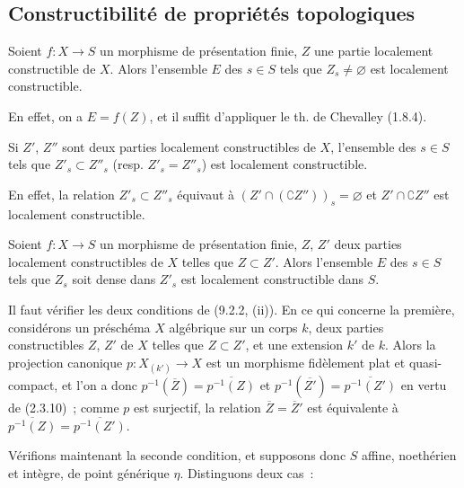 \subsection{Constructibilité de propriétés topologiques}
\label{subsection:IV.9.5-fr}

\begin{proposition}[9.5.1]
\label{IV.9.5.1-fr}
Soient $f:X\to S$ un morphisme de présentation finie, $Z$ une partie
localement constructible de $X$. Alors l'ensemble $E$ des $s\in S$ tels que
$Z_s\neq\varnothing$ est localement constructible.
\end{proposition}

En effet, on a $E=f(Z)$, et il suffit d'appliquer le th. de Chevalley (1.8.4).

\begin{corollary}[9.5.2]
\label{IV.9.5.2-fr}
Si $Z'$, $Z''$ sont deux parties localement constructibles de $X$, l'ensemble
des $s\in S$ tels que $Z'_s\subset Z''_s$ \textnormal{(resp.}
$Z'_s=Z''_s$\textnormal{)} est localement constructible.
\end{corollary}

En effet, la relation $Z'_s\subset Z''_s$ équivaut à
$(Z'\cap(\complement Z''))_s=\varnothing$ et
$Z'\cap\complement Z''$ est localement constructible.

\begin{proposition}[9.5.3]
\label{IV.9.5.3-fr}
Soient $f:X\to S$ un morphisme de présentation finie, $Z$, $Z'$ deux parties
localement constructibles de $X$ telles que $Z\subset Z'$. Alors l'ensemble
$E$ des $s\in S$ tels que $Z_s$ soit dense dans $Z'_s$ est localement
constructible dans $S$.
\end{proposition}

Il faut vérifier les deux conditions de (9.2.2, (ii)). En ce qui concerne la
première, considérons un préschéma $X$ algébrique sur un corps $k$, deux parties
constructibles $Z$, $Z'$ de $X$ telles que $Z\subset Z'$, et une extension
$k'$ de $k$. Alors la projection canonique $p:X_{(k')}\to X$ est un morphisme
fidèlement plat et quasi-compact, et l'on a donc
$p^{-1}(\overline Z)=\overline{p^{-1}(Z)}$ et
$p^{-1}(\overline{Z'})=\overline{p^{-1}(Z')}$ en vertu de (2.3.10)~; comme
$p$ est surjectif, la relation $\overline Z=\overline Z'$ est équivalente à
$\overline{p^{-1}(Z)}=\overline{p^{-1}(Z')}$.

Vérifions maintenant la seconde condition, et supposons donc $S$ affine,
noethérien et intègre, de point générique $\eta$. Distinguons deux cas~:

